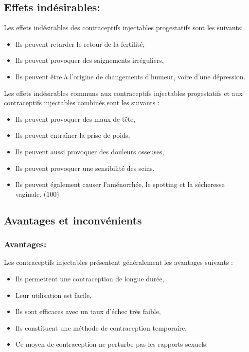 \subsection{Effets indésirables: }

Les effets indésirables des contraceptifs injectables progestatifs sont les suivants: 

\begin{itemize}[label={$\bullet$}, nosep] 
  \item Ils peuvent retarder le retour de la fertilité, 
  \item Ils peuvent provoquer des saignements irréguliers,
  \item Ils peuvent être à l’origine de changements d’humeur, voire d’une dépression. 
\end{itemize}

\vspace{1em}

\noindent Les effets indésirables communs aux contraceptifs injectables progestatifs et aux contraceptifs injectables combinés sont les suivants : 

\begin{itemize}
  \item	Ils peuvent provoquer des maux de tête, 
  \item	Ils peuvent entraîner la prise de poids, 
  \item	Ils peuvent aussi provoquer des douleurs osseuses, 
  \item	Ils peuvent provoquer une sensibilité des seins, 
  \item	Ils peuvent également causer l’aménorrhée, le spotting et la sécheresse vaginale. (100)
\end{itemize}

\subsection{Avantages et inconvénients}

\subsubsection{Avantages: }
Les contraceptifs injectables présentent généralement les avantages suivants : 

\begin{itemize}
  \item Ils permettent une contraception de longue durée, 
  \item Leur utilisation est facile,
  \item Ils sont efficaces avec un taux d’échec très faible, 
  \item Ils constituent une méthode de contraception temporaire,   
  \item	Ce moyen de contraception ne perturbe pas les rapports sexuels. 
\end{itemize}

